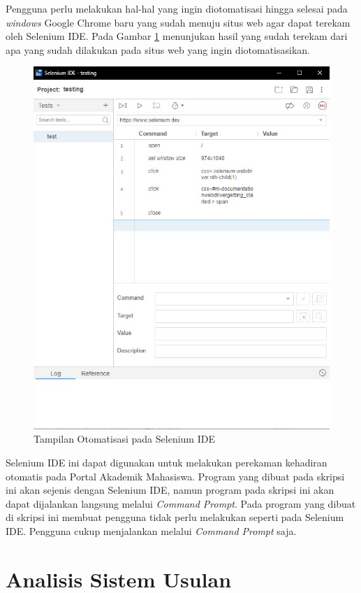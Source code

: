 Pengguna perlu melakukan hal-hal yang ingin diotomatisasi hingga selesai pada \textit{windows} Google Chrome baru yang sudah menuju situs web agar dapat terekam oleh Selenium IDE. Pada Gambar \ref{fig:testing} menunjukan hasil yang sudah terekam dari apa yang sudah dilakukan pada situs web yang ingin diotomatisasikan.
\begin{figure}[H]
	\centering
	\includegraphics[scale=0.4]{Gambar/testing.jpg}
	\caption{Tampilan Otomatisasi pada Selenium IDE} 
	\label{fig:testing}
\end{figure}	

Selenium IDE ini dapat digunakan untuk melakukan perekaman kehadiran otomatis pada Portal Akademik Mahasiswa. Program yang dibuat pada skripsi ini akan sejenis dengan Selenium IDE, namun program pada skripsi ini akan dapat dijalankan langsung melalui \textit{Command Prompt}. Pada program yang dibuat di skripsi ini membuat pengguna tidak perlu melakukan seperti pada Selenium IDE. Pengguna cukup menjalankan melalui \textit{Command Prompt} saja.

\section{Analisis Sistem Usulan}

